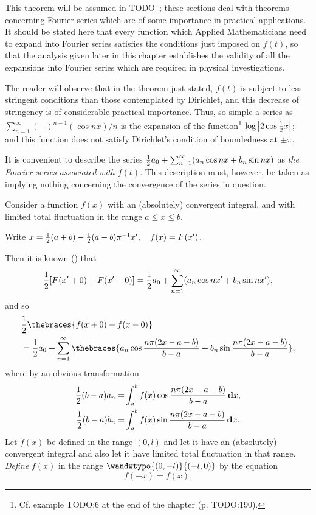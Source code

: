 This theorem will be assumed in
TODO--;
these sections deal with theorems concerning Fourier series which
are of some importance
in practical applications. It should be stated here that every
function which Applied Mathematicians need to expand into Fourier
series satisfies the conditions just imposed on $f(t)$, so that the
analysis given later in this chapter establishes the validity of all
the expansions into Fourier series which are required in physical
investigations.

The reader will observe that in the theorem just stated,
$f(t)$ is subject to less stringent conditions than those contemplated by
Dirichlet, and this decrease of stringency is of
considerable practical importance. Thus, so simple a series as
$\sum_{n=1}^{\infty} (-)^{n-1} (\cos nx) / n$
is the
expansion of the function\footnote{Cf. example TODO:6 at the end of the chapter (p. TODO:190).}
$\log \left| 2 \cos \frac{1}{2} x \right|$; and this function
does not satisfy Dirichlet's condition of boundedness at $\pm \pi$.

It is convenient to describe the series
$\frac{1}{2} a_{0} + \sum_{n=1}^{\infty} (a_{n} \cos nx + b_{n} \sin nx)$
as \emph{the Fourier series associated with $f(t)$}. This description must,
however, be
%
%
taken as implying nothing concerning the convergence of the series in
question.


Consider a function $f(x)$ with an (absolutely) convergent integral,
and with limited total fluctuation in the range $a \leq x \leq b$.

Write
$x = \frac{1}{2} (a + b) - \frac{1}{2} (a-b) \pi^{-1} x',
\quad
f(x) = F(x')$.

Then it is known () that
$$
\frac{1}{2} [F(x'+0) + F(x'-0)]
=
\frac{1}{2} a_{0} + \sum_{n=1}^{\infty} (a_{n} \cos nx' + b_{n} \sin nx'),
$$
and so
\begin{align*}
  & \half \thebraces{ f(x+0) + f(x-0)}
  \\
  &
  \hfill
  =
  \half a_{0}
  +
  \sum_{n=1}^{\infty}
  \thebraces{
    a_{n} \cos \frac{n \pi (2x-a-b)}{b-a}
    +
    b_{n} \sin \frac{n \pi (2x-a-b)}{b-a}
  },
\end{align*}
where by an obvious transformation
\begin{align*}
  \frac{1}{2} (b-a) a_{n} =& \int_{a}^{b} f(x) \cos \frac{n \pi (2x-a-b)}{b-a} \, \mathbf{d} x
  ,
  \\
  \frac{1}{2} (b-a) b_{n} =& \int_{a}^{b} f(x) \sin \frac{n \pi (2x-a-b)}{b-a} \, \mathbf{d} x
  .
\end{align*}
Let $f(x)$ be defined in the range $(0,l)$ and let it have an
(absolutely) convergent integral and also let it have limited
total fluctuation in that range.
\emph{Define} $f(x)$ in the range
$\wandwtypo{(0,-l)}{(-l,0)}$
by the equation
$$
f(-x) = f(x).
$$

